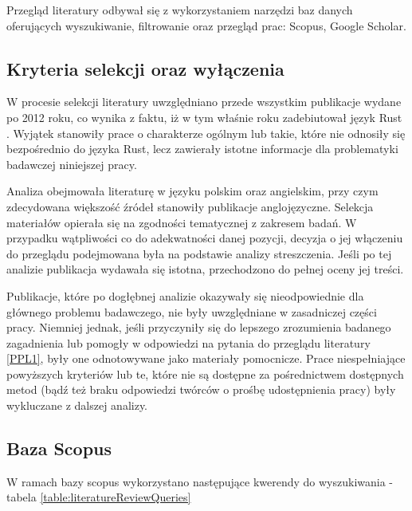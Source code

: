 Przegląd literatury odbywał się z wykorzystaniem narzędzi baz danych oferujących wyszukiwanie, filtrowanie oraz przegląd prac: Scopus, Google Scholar.

\subsection{Kryteria selekcji oraz wyłączenia}
\label{KryteriaSelekcji}
W procesie selekcji literatury uwzględniano przede wszystkim publikacje wydane po 2012 roku, co wynika z faktu, iż w tym właśnie roku zadebiutował język Rust \cite{wikipediaRustprogramming}. Wyjątek stanowiły prace o charakterze ogólnym lub takie, które nie odnosiły się bezpośrednio do języka Rust, lecz zawierały istotne informacje dla problematyki badawczej niniejszej pracy.

Analiza obejmowała literaturę w języku polskim oraz angielskim, przy czym zdecydowana większość źródeł stanowiły publikacje anglojęzyczne. Selekcja materiałów opierała się na zgodności tematycznej z zakresem badań. W przypadku wątpliwości co do adekwatności danej pozycji, decyzja o jej włączeniu do przeglądu podejmowana była na podstawie analizy streszczenia. Jeśli po tej analizie publikacja wydawała się istotna, przechodzono do pełnej oceny jej treści.

Publikacje, które po dogłębnej analizie okazywały się nieodpowiednie dla głównego problemu badawczego, nie były uwzględniane w zasadniczej części pracy. Niemniej jednak, jeśli przyczyniły się do lepszego zrozumienia badanego zagadnienia lub pomogły w odpowiedzi na pytania do przeglądu literatury \ref{PPL1}, były one odnotowywane jako materiały pomocnicze. Prace niespełniające powyższych kryteriów lub te, które nie są dostępne za pośrednictwem dostępnych metod (bądź też braku odpowiedzi twórców o prośbę udostępnienia pracy) były wykluczane z dalszej analizy.


\subsection{Baza Scopus}
W ramach bazy scopus wykorzystano następujące kwerendy do wyszukiwania - tabela \ref{table:literatureReviewQueries}

